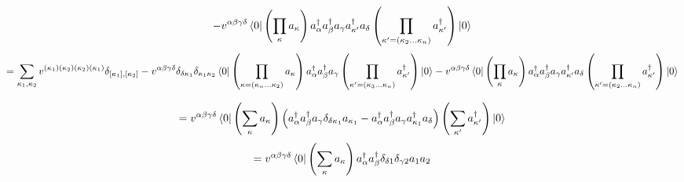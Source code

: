 \documentclass[12pt]{article}
\begin{document}
\begin{enumerate}
\begin{dmath}
    -v^{\alpha\beta\gamma\delta}
    \bra{0}\left(\prod_{\kappa}^{}a_{\kappa}\right)
    a^{\dag}_{\alpha}a^{\dag}_{\beta}a_{\gamma}a^{\dag}_{\kappa^{\prime}}a_{\delta}
    \left(\prod_{\kappa^{\prime}=\left(\kappa_{2}\dots\kappa_{n}\right)}^{}a^{\dag}_{\kappa^{\prime}}\right)\ket{0}
    \end{dmath}
    \begin{dmath}
    =\sum_{\kappa_{1},\kappa_{2}}
    v^{\left(\kappa_{1}\right)\left(\kappa_{2}\right)\left(\kappa_{2}\right)\left(\kappa_{1}\right)}\delta_{[\kappa_{1}],[\kappa_{2}]}
        -v^{\alpha\beta\gamma\delta}
        \delta_{\delta\kappa_{1}}\delta_{\kappa_{1}\kappa_{2}}
        \bra{0}\left(\prod_{\kappa=\left(\kappa_{n}\dots\kappa_{2}\right)}a_{\kappa}\right)
        a^{\dag}_{\alpha}a^{\dag}_{\beta}a_{\gamma}
        \left(\prod_{\kappa^{\prime}=\left(\kappa_{3}\dots\kappa_{n}\right)}a^{\dag}_{\kappa^{\prime}}\right)\ket{0}
    -v^{\alpha\beta\gamma\delta}
    \bra{0}\left(\prod_{\kappa}a_{\kappa}\right)
    a^{\dag}_{\alpha}a^{\dag}_{\beta}a_{\gamma}a^{\dag}_{\kappa^{\prime}}a_{\delta}
    \left(\prod_{\kappa^{\prime}=\left(\kappa_{2}\dots\kappa_{n}\right)}a^{\dag}_{\kappa^{\prime}}\right)\ket{0}
    \end{dmath}

    \begin{dmath}
        =v^{\alpha\beta\gamma\delta}\bra{0}\left(\sum_{\kappa}a_{\kappa}\right)
            \left(a^{\dag}_{\alpha}a^{\dag}_{\beta}a_{\gamma}\delta_{\delta\kappa_{1}}a_{\kappa_{1}}
                -a^{\dag}_{\alpha}a^{\dag}_{\beta}a_{\gamma}a^{\dag}_{\kappa_{1}}a_{\delta}\right
        )\left(\sum_{\kappa^{\prime}}a^{\dag}_{\kappa^{\prime}}\right)\ket{0}
    \end{dmath}
    \begin{dmath}
        =v^{\alpha\beta\gamma\delta}\bra{0}\left(\sum_{\kappa}a_{\kappa}\right)a^{\dag}_{\alpha}a^{\dag}_{\beta}\delta_{\delta1}\delta_{\gamma2}a_{1}a_{2}
    \end{dmath}
    
\end{enumerate}
\end{document}
